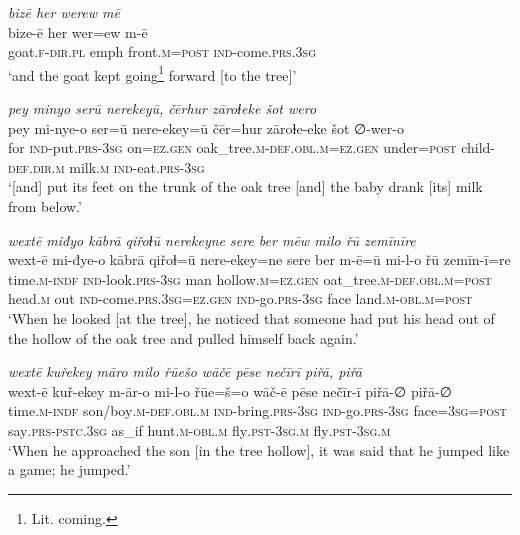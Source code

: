 \ea \label{ZB.44}
\textit{bizē her werew mē} \\ 
\gll bize-ē her wer=ew m-ē \\ 
 goat\textsc{.f}\textsc{-dir}\textsc{.pl} emph front\textsc{.m}\textsc{=\textsc{post}} \textsc{ind-}come\textsc{.prs}\textsc{.3sg} \\ 
\glt `and the goat kept going\footnote{Lit. coming.} forward [to the tree]'
\z 
 
\ea \label{ZB.45}
\textit{pey minyo serū nerekeyū, čērhur zāroɫeke šot wero} \\ 
\gll pey mi-nye-o ser=ū nere-ekey=ū čēr=hur zāroɫe-eke šot ∅-wer-o \\ 
 for \textsc{ind-}put\textsc{.prs}\textsc{-3sg} on\textsc{\textsc{=ez.gen}} oak\_tree\textsc{.m}\textsc{-def}\textsc{.obl}\textsc{.m}\textsc{\textsc{=ez.gen}} under\textsc{=\textsc{post}} child\textsc{-def}\textsc{.dir}\textsc{.m} milk\textsc{.m} \textsc{ind-}eat\textsc{.prs}\textsc{-3sg} \\ 
\glt `[and] put its feet on the trunk of the oak tree [and] the baby drank [its] milk from below.'
\z 
 
\ea \label{ZB.48}
\textit{wextē miđyo kābrā qiřoɫū nerekeyne sere ber mēw milo řū zemīnīre} \\ 
\gll wext-ē mi-đye-o kābrā qiřoɫ=ū nere-ekey=ne sere ber m-ē=ū mi-l-o řū zemīn-ī=re \\ 
 time\textsc{.m}\textsc{-indf} \textsc{ind-}look\textsc{.prs}\textsc{-3sg} man hollow\textsc{.m}\textsc{\textsc{=ez.gen}} oat\_tree\textsc{.m}\textsc{-def}\textsc{.obl}\textsc{.m}\textsc{=\textsc{post}} head\textsc{.m} out \textsc{ind-}come\textsc{.prs}\textsc{.3sg}\textsc{\textsc{=ez.gen}} \textsc{ind-}go\textsc{.prs}\textsc{-3sg} face land\textsc{.m}\textsc{-obl}\textsc{.m}\textsc{=\textsc{post}} \\ 
\glt `When he looked [at the tree], he noticed that someone had put his head out of the hollow of the oak tree and pulled himself back again.'
\z 
 
\ea \label{ZB.56}
\textit{wextē kuřekey māro milo řūešo wāčē pēse nečīrī piřā, piřā} \\ 
\gll wext-ē kuř-ekey m-ār-o mi-l-o řūe=š=o wāč-ē pēse nečīr-ī piřā-∅ piřā-∅ \\ 
 time\textsc{.m}\textsc{-indf} son/boy\textsc{.m}\textsc{-def}\textsc{.obl}\textsc{.m} \textsc{ind-}bring\textsc{.prs}\textsc{-3sg} \textsc{ind-}go\textsc{.prs}\textsc{-3sg} face\textsc{=3sg}\textsc{=\textsc{post}} say\textsc{.prs-pstc}\textsc{.3sg} as\_if hunt\textsc{.m}\textsc{-obl}\textsc{.m} fly\textsc{.pst}\textsc{-3sg}\textsc{.m} fly\textsc{.pst}\textsc{-3sg}\textsc{.m} \\ 
\glt `When he approached the son [in the tree hollow], it was said that he jumped like a game; he jumped.'
\z 
 
